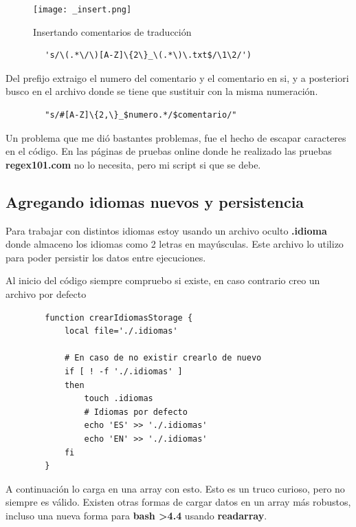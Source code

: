 \documentclass{article}
\begin{document}
        \begin{figure}
            \centering
            \texttt{[image: \_insert.png]}
            \caption{Insertando comentarios de traducción}
        \end{figure}
        
        \begin{verbatim}
        's/\(.*\/\)[A-Z]\{2\}_\(.*\)\.txt$/\1\2/')
        \end{verbatim}

        Del prefijo extraigo el numero del comentario y el comentario en si, y a posteriori busco en el archivo donde se tiene que sustituir con la misma numeración.

        \begin{verbatim}
        "s/#[A-Z]\{2,\}_$numero.*/$comentario/"
        \end{verbatim}

        Un problema que me dió bastantes problemas, fue el hecho de escapar caracteres en el código. En las páginas de pruebas online donde he realizado las pruebas \textbf{regex101.com} no lo necesita, pero mi script si que se debe.
    
    \subsection{Agregando idiomas nuevos y persistencia}
        Para trabajar con distintos idiomas estoy usando un archivo oculto \textbf{.idioma} donde almaceno los idiomas como 2 letras en mayúsculas. Este archivo lo utilizo para poder persistir los datos entre ejecuciones.


        Al inicio del código siempre compruebo si existe, en caso contrario creo un archivo por defecto
        \begin{verbatim}
        function crearIdiomasStorage {
            local file='./.idiomas'
        
            # En caso de no existir crearlo de nuevo
            if [ ! -f './.idiomas' ]
            then
                touch .idiomas
                # Idiomas por defecto
                echo 'ES' >> './.idiomas'
                echo 'EN' >> './.idiomas'
            fi
        }
        \end{verbatim}

        A continuación lo carga en una array con esto. Esto es un truco curioso, pero no siempre es válido. Existen otras formas de cargar datos en un array más robustos, incluso una nueva forma para \textbf{bash >4.4} usando \textbf{readarray}.
\end{document}
